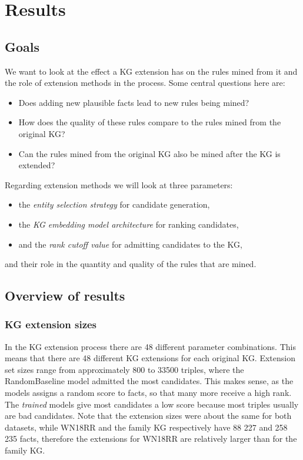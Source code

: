 \chapter{Results}

\section{Goals}
We want to look at the effect a KG extension has on the rules mined from it and the role of extension methods in the process. Some central questions here are:
\begin{itemize}
    \item Does adding new plausible facts lead to new rules being mined?
    \item How does the quality of these rules compare to the rules mined from the original KG?
    \item Can the rules mined from the original KG also be mined after the KG is extended?
\end{itemize}
Regarding extension methods we will look at three parameters:
\begin{itemize}
    \item the \textit{entity selection strategy} for candidate generation,
    \item the \textit{KG embedding model architecture} for ranking candidates,
    \item and the \textit{rank cutoff value} for admitting candidates to the KG,
\end{itemize}
and their role in the quantity and quality of the rules that are mined.
\section{Overview of results}

\subsection{KG extension sizes}
In the KG extension process there are 48 different parameter combinations. This means that there are 48 different KG extensions for each original KG. Extension set sizes range from approximately 800 to 33500 triples, where the RandomBaseline model admitted the most candidates. This makes sense, as the models assigns a random score to facts, so that many more receive a high rank. The \textit{trained} models give most candidates a low score because most triples usually are bad candidates. Note that the extension sizes were about the same for both datasets, while WN18RR and the family KG respectively have 88 227 and 258 235 facts, therefore the extensions for WN18RR are relatively larger than for the family KG.

